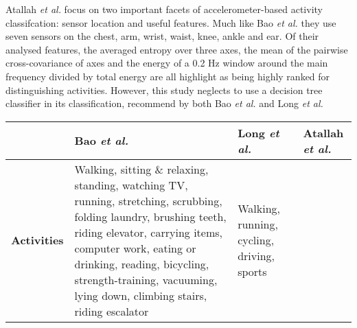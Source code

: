     Atallah \emph{et al.} \cite{atallah2010sensor} focus on two important facets of accelerometer-based activity classifcation: sensor location and useful features. Much like Bao \emph{et al.} they use seven sensors on the chest, arm, wrist, waist, knee, ankle and ear. Of their analysed features, the averaged entropy over three axes, the mean of the pairwise cross-covariance of axes and the energy of a 0.2 Hz window around the main frequency divided by total energy are all highlight as being highly ranked for distinguishing activities. However, this study neglects to use a decision tree classifier in its classification, recommend by both Bao \emph{et al.} and Long \emph{et al.}
    \begin{table}[p]
      \setlength\extrarowheight{5pt}
      \begin{tabu} to 
        \hline
          & \textbf{Bao \emph{et al.} \cite{bao2004activity}}
          & \textbf{Long \emph{et al.} \cite{long2009single}}
          & \textbf{Atallah \emph{et al.} \cite{atallah2010sensor}} \\
        \hline
          \textbf{Activities}
          & Walking, \newline sitting \& relaxing, \newline standing, \newline watching TV,
              \newline running, \newline stretching, \newline scrubbing, \newline folding laundry, 
              \newline brushing teeth, \newline riding elevator, \newline carrying items, 
              \newline computer work, \newline eating or drinking, \newline reading, 
              \newline bicycling, \newline strength-training, \newline vacuuming, 
              \newline lying down, \newline climbing stairs, \newline riding escalator \newline
          & Walking, \newline running, \newline cycling, \newline driving, \newline sports

\end{tabu}
\end{table}
